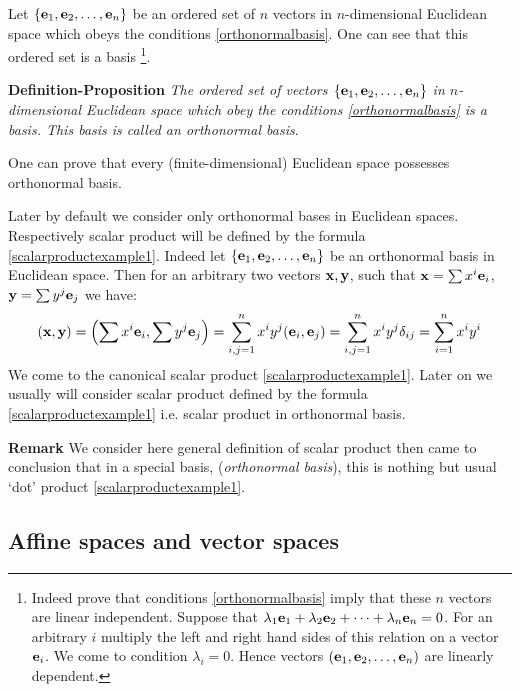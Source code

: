 \documentclass[12pt]{article}
\numberwithin{equation}{section}
\begin{document}
   Let  $\{{\bf e}_1,{\bf e}_2,\dots,{\bf e}_n\}$ be an ordered set of $n$ vectors in $n$-dimensional
   Euclidean space which obeys the conditions
 \eqref{orthonormalbasis}. One can see that this ordered set is a basis
 \footnote
 {Indeed prove that conditions \eqref{orthonormalbasis} imply that these $n$ vectors are linear independent.
 Suppose that $\lambda_1{\bf e}_1+\lambda_2{\bf e}_2+\dots+\lambda_n{\bf e}_n=0$.
 For an arbitrary $i$ multiply the left and right hand sides of this relation on
 a vector ${\bf e}_i$. We come to condition $\lambda_i=0$.
 Hence vectors $({\bf e}_1,{\bf e}_2,\dots,{\bf e}_n)$ are linearly dependent.}.

{\bf Definition-Proposition}    {\it The ordered set of vectors
$\{{\bf e}_1,{\bf e}_2,\dots,{\bf e}_n\}$ in $n$-dimensional Euclidean space which obey the conditions
 \eqref{orthonormalbasis} is a basis.  
This basis  is called  an orthonormal basis}.



\smallskip

 One can prove that every (finite-dimensional)  Euclidean
 space possesses orthonormal basis.

 Later by default we consider only orthonormal bases in Euclidean spaces.
 Respectively scalar product will be defined by 
the formula \eqref{scalarproductexample1}.
 Indeed let $\{{\bf e}_1,{\bf e}_2,\dots,{\bf e}_n\}$ be an orthonormal basis in Euclidean space. Then for an arbitrary two vectors
 ${\bf x},{\bf y}$, such that ${\bf x}=\sum x^i{{\bf e}_i}$, ${\bf y}=\sum y^j{{\bf e}_j}$ we have:
    \begin{equation*}\label{scalarproduct4}
    ({\bf x},{\bf y})=\left(\sum x^i{{\bf e}_i},\sum y^j{{\bf e}_j}\right)=
    \sum_{i,j=1}^nx^iy^j({\bf e}_i,{\bf e}_j)=\sum_{i,j=1}^nx^iy^j\delta_{ij}=
    \sum_{i=1}^nx^iy^i
\end{equation*}
 We come to the canonical  scalar product \eqref{scalarproductexample1}.
Later on we usually will consider scalar product defined by the formula
  \eqref{scalarproductexample1} 
i.e. scalar product in orthonormal basis.

\smallskip

{\bf Remark} We consider here general definition of scalar product
then came  to conclusion that in a special basis, 
({\it orthonormal basis}),
this is nothing but usual `dot' product 
\eqref{scalarproductexample1}. 




\subsection{Affine spaces and vector spaces}\label{affineandvectorspaces}
\end{document}

